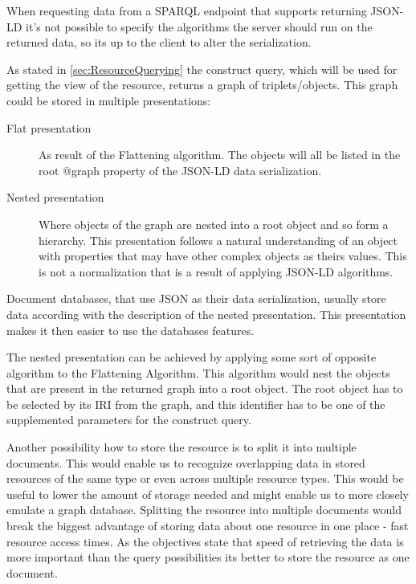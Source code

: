 When requesting data from a SPARQL endpoint that supports returning JSON-LD it's not possible to specify the algorithms the server should run on the returned data, so its up to the client to alter the serialization.

As stated in \autoref{sec:ResourceQuerying} the construct query, which will be used for getting the view of the resource, returns a graph of triplets/objects. This graph could be stored in multiple presentations:
\begin{description}
\item[Flat presentation] As result of the Flattening algorithm. The objects will all be listed in the root @graph property of the JSON-LD data serialization.
\item[Nested presentation] Where objects of the graph are nested into a root object and so form a hierarchy. This presentation follows a natural understanding of an object with properties that may have other complex objects as theirs values. This is not a normalization that is a result of applying JSON-LD algorithms.
\end{description}
Document databases, that use JSON as their data serialization, usually store data according with the description of the nested presentation. This presentation makes it then easier to use the databases features.

The nested presentation can be achieved by applying some sort of opposite algorithm to the Flattening Algorithm. This algorithm would nest the objects that are present in the returned graph into a root object. The root object has to be selected by its IRI from the graph, and this identifier has to be one of the supplemented parameters for the construct query.

Another possibility how to store the resource is to split it into multiple documents. This would enable us to recognize overlapping data in stored resources of the same type or even across multiple resource types. This would be useful to lower the amount of storage needed and might enable us to more closely emulate a graph database. Splitting the resource into multiple documents would break the biggest advantage of storing data about one resource in one place - fast resource access times. As the objectives state that speed of retrieving the data is more important than the query possibilities its better to store the resource as one document.

